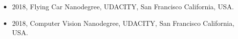 \begin{itemize} 
\item 2018, Flying Car Nanodegree, UDACITY, San Francisco California, USA.
\item 2018, Computer Vision Nanodegree, UDACITY, San Francisco California, USA.
\end{itemize} 

